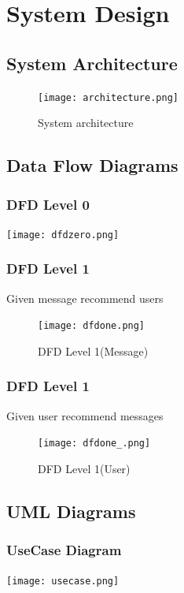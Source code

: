 \documentclass[oneside,a4paper,12pt, times]{book}
\begin{document}
\chapter{System Design}
\section{System Architecture}
\begin{figure}[h]
    \centering
     \texttt{[image: architecture.png]}
    \caption{System architecture}
    \label{fig:my_label}
\end{figure}


\newpage
\section{Data Flow Diagrams}
 \subsection{DFD Level 0}
 \begin{center}
     \centering
     \texttt{[image: dfdzero.png]}
     \label{fig:my_label}
 \end{center}
    
   
\subsection{DFD Level 1}
\vskip 1cm
Given message recommend users
\begin{figure}[h]
    \centering
\texttt{[image: dfdone.png]}    \caption{DFD Level 1(Message)}
    \label{fig:my_label}
\end{figure}
    
\subsection{DFD Level 1}
\vskip 1cm
Given user recommend messages
\begin{figure}[h]
    \centering
\texttt{[image: dfdone\_.png]}    \caption{DFD Level 1(User)}
    \label{fig:my_label}
\end{figure}
   
 
 \section{UML Diagrams}
 \subsection{UseCase Diagram}
\begin{center}
    \centering
\texttt{[image: usecase.png]}
    \label{fig:my_label}
\end{center}
  
\end{document}
